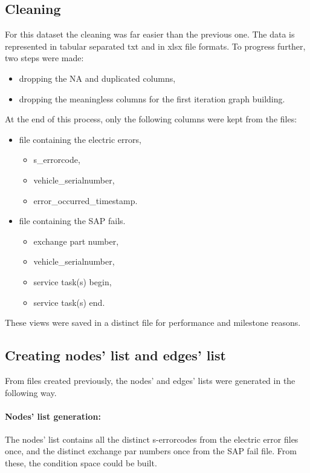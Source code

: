 	\subsection{Cleaning}
For this dataset the cleaning was far easier than the previous one. The data is represented in tabular separated txt and in xlsx file formats.
To progress further, two steps were made:
\begin{itemize}
			\item{dropping the NA and duplicated columns,}
			\item{dropping the meaningless columns for the first iteration graph building.}
\end{itemize}

At the end of this process, only the following columns were kept from the files:
\begin{itemize}
			\item{file containing the electric errors,}
			\begin{itemize}
				\item{s\_errorcode,}
				\item{vehicle\_serialnumber,}
				\item{error\_occurred\_timestamp.}
			\end{itemize}
			\item{file containing the SAP fails.}
			\begin{itemize}
				\item{exchange part number,}
				\item{vehicle\_serialnumber,}
				\item{service task(s) begin,}
				\item{service task(s) end.}
			\end{itemize}
\end{itemize}
These views were saved in a distinct file for performance and milestone reasons.
	\subsection{Creating nodes' list and edges' list}
From files created previously, the nodes' and edges' lists were generated in the following way.
\paragraph{Nodes' list generation:}
The nodes' list contains all the distinct s-errorcodes from the electric error files once, and the distinct exchange par numbers once from the SAP fail file. From these, the condition space could be built.
